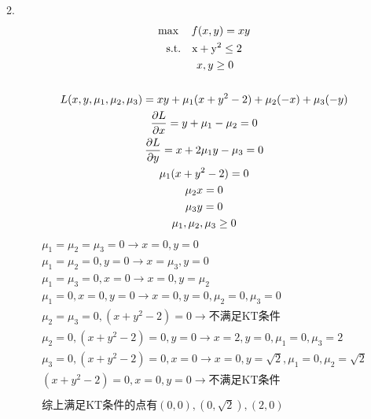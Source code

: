 \documentclass{article}
\begin{document}
    2. 
    \begin{gather*}
        \max \quad f(x, y) = xy\\
        \rm{s.t.} \quad x + y^2 \le 2\\
        \qquad x, y \ge 0\\
        \\
        L(x, y, \mu_1, \mu_2, \mu_3) = xy + \mu_1 (x + y^2 - 2) + \mu_2 (-x) + \mu_3 (-y)\\
        \frac{\partial L}{\partial x} = y + \mu_1 - \mu_2 = 0\\
        \frac{\partial L}{\partial y} = x + 2 \mu_1 y - \mu_3 = 0\\
        \mu_1 (x + y^2 -2) = 0\\
        \mu_2 x = 0\\
        \mu_3 y = 0\\
        \mu_1, \mu_2, \mu_3 \ge 0
    \end{gather*}
    \begin{gather*}
        \mu_1 = \mu_2 = \mu_3 = 0 \rightarrow x=0, y=0\\
        \mu_1 = \mu_2 = 0, y = 0 \rightarrow x = \mu_3, y = 0\\
        \mu_1 = \mu_3 = 0, x = 0 \rightarrow x=0, y = \mu_2\\
        \mu_1 = 0, x = 0, y = 0 \rightarrow x=0, y=0, \mu_2 =0, \mu_3=0\\
        \mu_2 = \mu_3 = 0, (x + y^2 -2) = 0 \rightarrow\text{不满足KT条件}\\
        \mu_2 = 0 ,(x + y^2 -2) = 0 , y = 0\rightarrow x=2, y=0, \mu_1=0, \mu_3 =2\\
        \mu_3 = 0 ,(x + y^2 -2) = 0 , x = 0\rightarrow x = 0, y=\sqrt{2}, \mu_1 = 0, \mu_2 = \sqrt{2}\\
        (x + y^2 -2) = 0 , x = 0, y = 0 \rightarrow \text{不满足KT条件}\\
        \\
        \text{综上满足KT条件的点有}(0,0),(0,\sqrt{2}),(2,0)
    \end{gather*}
\end{document}
